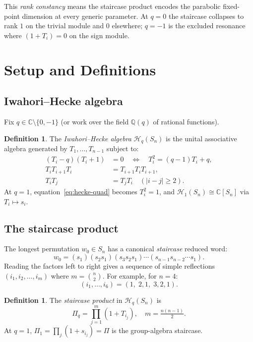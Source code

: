\documentclass[12pt]{article}
\theoremstyle{remark}
\theoremstyle{definition}
\newtheorem{definition}[theorem]{Definition}
\begin{document}
\medskip
This \emph{rank constancy} means the staircase product encodes the parabolic
fixed-point dimension at every generic parameter.  At $q = 0$ the staircase collapses
to rank $1$ on the trivial module and $0$ elsewhere; $q = -1$ is the excluded resonance
where $(1+T_i) = 0$ on the sign module.

\section{Setup and Definitions}

\subsection{Iwahori--Hecke algebra}

Fix $q \in \mathbb{C} \setminus \{0,-1\}$ (or work over the field $\mathbb{Q}(q)$ of rational
functions).

\begin{definition}
The \emph{Iwahori--Hecke algebra} $\mathcal{H}_q(S_n)$ is the unital associative algebra
generated by $T_1, \ldots, T_{n-1}$ subject to:
\begin{align}
  (T_i - q)(T_i + 1) &= 0 \quad \Longleftrightarrow\quad T_i^2 = (q-1)T_i + q,
    \label{eq:hecke-quad}\\
  T_i T_{i+1} T_i &= T_{i+1} T_i T_{i+1}, \label{eq:braid}\\
  T_i T_j &= T_j T_i \quad (|i-j| \geq 2). \label{eq:commute}
\end{align}
At $q = 1$, equation~\eqref{eq:hecke-quad} becomes $T_i^2 = 1$, and
$\mathcal{H}_1(S_n) \cong \mathbb{C}[S_n]$ via $T_i \mapsto s_i$.
\end{definition}

\subsection{The staircase product}

The longest permutation $w_0 \in S_n$ has a canonical \emph{staircase} reduced word:
\[
  w_0 = (s_1)(s_2 s_1)(s_3 s_2 s_1)\cdots(s_{n-1} s_{n-2} \cdots s_1).
\]
Reading the factors left to right gives a sequence of simple reflections
$(i_1, i_2, \ldots, i_m)$ where $m = \binom{n}{2}$.  For example, for $n = 4$:
\[
  (i_1,\ldots,i_6) = (1,\; 2,1,\; 3,2,1).
\]

\begin{definition}
The \emph{staircase product} in $\mathcal{H}_q(S_n)$ is
\[
  \Pi_q = \prod_{j=1}^{m}(1 + T_{i_j}),
  \quad m = \tfrac{n(n-1)}{2}.
\]
At $q = 1$, $\Pi_1 = \prod_j (1 + s_{i_j}) = \Pi$ is the group-algebra staircase.
\end{definition}
\end{document}
